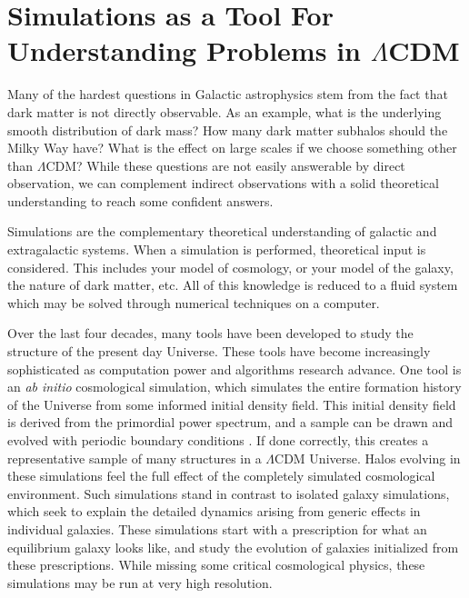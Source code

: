 
\section{Simulations as a Tool For Understanding Problems in $\Lambda$CDM}

Many of the hardest questions in Galactic astrophysics stem from the fact that dark matter is not directly observable. As an example, what is the underlying smooth distribution of dark mass? How many dark matter subhalos should the Milky Way have? What is the effect on large scales if we choose something other than $\Lambda$CDM? While these questions are not easily answerable by direct observation, we can complement indirect observations with a solid theoretical understanding to reach some confident answers.

Simulations are the complementary theoretical understanding of galactic and extragalactic systems. When a simulation is performed, theoretical input is considered. This includes your model of cosmology, or your model of the galaxy, the nature of dark matter, etc. All of this knowledge is reduced to a fluid system which may be solved through numerical techniques on a computer.  

Over the last four decades, many tools have been developed to study the structure of the present day Universe. These tools have become increasingly sophisticated as computation power and algorithms research advance. One tool is an \textit{ab initio} cosmological simulation, which simulates the entire formation history of the Universe from some informed initial density field.  This initial density field is derived from the primordial power spectrum, and a sample can be drawn and evolved with periodic boundary conditions \citep{music}. If done correctly, this creates a representative sample of many structures in a $\Lambda$CDM Universe. Halos evolving in these simulations feel the full effect of the completely simulated cosmological environment. Such simulations stand in contrast to isolated galaxy simulations, which seek to explain the detailed dynamics arising from generic effects in individual galaxies. These simulations start with a prescription for what an equilibrium galaxy looks like, and study the evolution of galaxies initialized from these prescriptions. While missing some critical cosmological physics, these simulations may be run at very high resolution.


